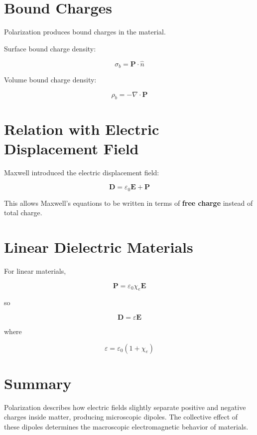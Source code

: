 \documentclass[12pt, a4paper]{article}
\begin{document}
\begin{center}
\end{center}

\section{Bound Charges}

Polarization produces bound charges in the material.

Surface bound charge density:

\[
\sigma_b = \mathbf{P} \cdot \hat{n}
\]

Volume bound charge density:

\[
\rho_b = - \nabla \cdot \mathbf{P}
\]

\section{Relation with Electric Displacement Field}

Maxwell introduced the electric displacement field:

\[
\mathbf{D} = \varepsilon_0 \mathbf{E} + \mathbf{P}
\]

This allows Maxwell's equations to be written in terms of \textbf{free charge} instead of total charge.

\section{Linear Dielectric Materials}

For linear materials,

\[
\mathbf{P} = \varepsilon_0 \chi_e \mathbf{E}
\]

so

\[
\mathbf{D} = \varepsilon \mathbf{E}
\]

where

\[
\varepsilon = \varepsilon_0 (1 + \chi_e)
\]

\section{Summary}

Polarization describes how electric fields slightly separate positive and negative charges inside matter, producing microscopic dipoles. The collective effect of these dipoles determines the macroscopic electromagnetic behavior of materials.
\end{document}
